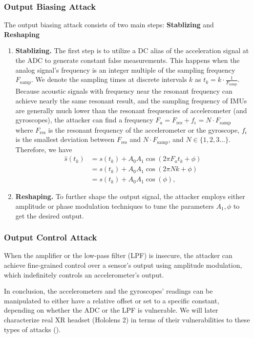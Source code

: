 \subsubsection{Output Biasing Attack}
The output biasing attack consists of two main steps: \textbf{Stablizing} and \textbf{Reshaping}
\begin{enumerate}
    \item \textbf{Stablizing.} The first step is to utilize a DC alias of the acceleration signal at the ADC to generate constant false measurements. This happens when the analog signal’s frequency is an integer multiple of the sampling frequency $F_{\text{samp}}$. We denote the sampling times at discrete intervals $k$ as $t_k=k\cdot\frac{1}{F_{\text{samp}}}$. Because acoustic signals with frequency near the resonant frequency can achieve nearly the same resonant result, and the sampling frequency of IMUs are generally much lower than the resonant frequencies of accelerometer (and gyroscopes), the attacker can find a frequency $F_a = F_{\text{res}} + f_\epsilon = N\cdot F_{\text{samp}}$ where $F_\text{res}$ is the resonant frequency of the accelerometer or the gyroscope, $f_\epsilon$ is the smallest deviation between $F_\text{res}$ and $N\cdot F_{\text{samp}}$, and $N\in\{1,2,3...\}$. Therefore, we have
    \begin{align}
        \hat{s}(t_k) &= s(t_k) + A_0 A_1 \cos(2\pi F_a t_k+\phi) \\
        &= s(t_k) + A_0 A_1 \cos(2\pi Nk+\phi) \\
        &= s(t_k) + A_0 A_1 \cos(\phi),
    \end{align}
    \item \textbf{Reshaping.} To further shape the output signal, the attacker employs either amplitude or phase modulation techniques to tune the parameters $A_1, \phi$ to get the desired output.
\end{enumerate}

\subsubsection{Output Control Attack} 
When the amplifier or the low-pass filter (LPF) is insecure, the attacker can achieve fine-grained control over a sensor’s output using amplitude modulation, which indefinitely controls an accelerometer’s output. 

In conclusion, the accelerometers and the gyroscopes' readings can be manipulated to either have a relative offset or set to a specific constant, depending on whether the ADC or the LPF is  vulnerable.
We will later characterize real XR headset (Hololens 2) in terms of their vulnerabilities to these types of attacks ().

